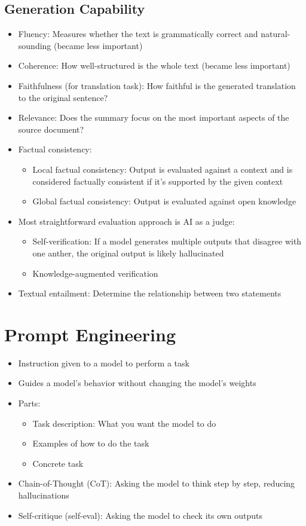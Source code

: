 \documentclass[11pt]{scrartcl}
\begin{document}
\subsection*{Generation Capability}
\begin{itemize}
	\item Fluency: Measures whether the text is grammatically correct and natural-sounding (became less important)
	\item Coherence: How well-structured is the whole text (became less important)
	\item Faithfulness (for translation task): How faithful is the generated translation to the original sentence?
	\item Relevance: Does the summary focus on the most important aspects of the source document?
	\item Factual consistency:
	\begin{itemize}
		\item Local factual consistency: Output is evaluated against a context and is considered factually consistent if it's supported by the given context
		\item Global factual consistency: Output is evaluated against open knowledge
	\end{itemize}
	\item Most straightforward evaluation approach is AI as a judge:
	\begin{itemize}
		\item Self-verification: If a model generates multiple outputs that disagree with one anther, the original output is likely hallucinated
		\item Knowledge-augmented verification
	\end{itemize}
	\item Textual entailment: Determine the relationship between two statements
\end{itemize}


\newpage
\section*{Prompt Engineering}
\begin{itemize}
	\item Instruction given to a model to perform a task
	\item Guides a model's behavior without changing the model's weights
	\item Parts:
	\begin{itemize}
		\item Task description: What you want the model to do
		\item Examples of how to do the task
		\item Concrete task
	\end{itemize}
	\item Chain-of-Thought (CoT): Asking the model to think step by step, reducing hallucinations
	\item Self-critique (self-eval): Asking the model to check its own outputs
\end{itemize}
\end{document}
